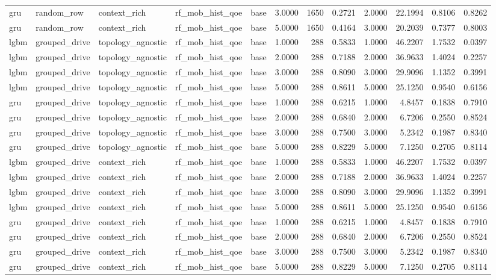\begin{tabular}{lllllrrrrrrr}
gru & random\_row & context\_rich & rf\_mob\_hist\_qoe & base & 3.0000 & 1650 & 0.2721 & 2.0000 & 22.1994 & 0.8106 & 0.8262 \\
gru & random\_row & context\_rich & rf\_mob\_hist\_qoe & base & 5.0000 & 1650 & 0.4164 & 3.0000 & 20.2039 & 0.7377 & 0.8003 \\
lgbm & grouped\_drive & topology\_agnostic & rf\_mob\_hist\_qoe & base & 1.0000 & 288 & 0.5833 & 1.0000 & 46.2207 & 1.7532 & 0.0397 \\
lgbm & grouped\_drive & topology\_agnostic & rf\_mob\_hist\_qoe & base & 2.0000 & 288 & 0.7188 & 2.0000 & 36.9633 & 1.4024 & 0.2257 \\
lgbm & grouped\_drive & topology\_agnostic & rf\_mob\_hist\_qoe & base & 3.0000 & 288 & 0.8090 & 3.0000 & 29.9096 & 1.1352 & 0.3991 \\
lgbm & grouped\_drive & topology\_agnostic & rf\_mob\_hist\_qoe & base & 5.0000 & 288 & 0.8611 & 5.0000 & 25.1250 & 0.9540 & 0.6156 \\
gru & grouped\_drive & topology\_agnostic & rf\_mob\_hist\_qoe & base & 1.0000 & 288 & 0.6215 & 1.0000 & 4.8457 & 0.1838 & 0.7910 \\
gru & grouped\_drive & topology\_agnostic & rf\_mob\_hist\_qoe & base & 2.0000 & 288 & 0.6840 & 2.0000 & 6.7206 & 0.2550 & 0.8524 \\
gru & grouped\_drive & topology\_agnostic & rf\_mob\_hist\_qoe & base & 3.0000 & 288 & 0.7500 & 3.0000 & 5.2342 & 0.1987 & 0.8340 \\
gru & grouped\_drive & topology\_agnostic & rf\_mob\_hist\_qoe & base & 5.0000 & 288 & 0.8229 & 5.0000 & 7.1250 & 0.2705 & 0.8114 \\
lgbm & grouped\_drive & context\_rich & rf\_mob\_hist\_qoe & base & 1.0000 & 288 & 0.5833 & 1.0000 & 46.2207 & 1.7532 & 0.0397 \\
lgbm & grouped\_drive & context\_rich & rf\_mob\_hist\_qoe & base & 2.0000 & 288 & 0.7188 & 2.0000 & 36.9633 & 1.4024 & 0.2257 \\
lgbm & grouped\_drive & context\_rich & rf\_mob\_hist\_qoe & base & 3.0000 & 288 & 0.8090 & 3.0000 & 29.9096 & 1.1352 & 0.3991 \\
lgbm & grouped\_drive & context\_rich & rf\_mob\_hist\_qoe & base & 5.0000 & 288 & 0.8611 & 5.0000 & 25.1250 & 0.9540 & 0.6156 \\
gru & grouped\_drive & context\_rich & rf\_mob\_hist\_qoe & base & 1.0000 & 288 & 0.6215 & 1.0000 & 4.8457 & 0.1838 & 0.7910 \\
gru & grouped\_drive & context\_rich & rf\_mob\_hist\_qoe & base & 2.0000 & 288 & 0.6840 & 2.0000 & 6.7206 & 0.2550 & 0.8524 \\
gru & grouped\_drive & context\_rich & rf\_mob\_hist\_qoe & base & 3.0000 & 288 & 0.7500 & 3.0000 & 5.2342 & 0.1987 & 0.8340 \\
gru & grouped\_drive & context\_rich & rf\_mob\_hist\_qoe & base & 5.0000 & 288 & 0.8229 & 5.0000 & 7.1250 & 0.2705 & 0.8114 \\
\bottomrule
\end{tabular}
